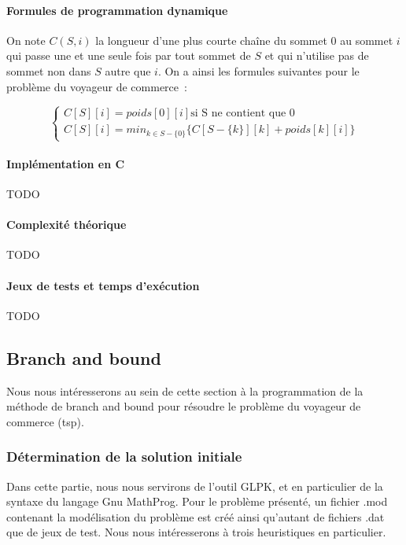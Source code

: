\documentclass[a4paper, 12pt]{article}
\begin{document}
\paragraph{Formules de programmation dynamique}

On note $C(S,i)$ la longueur d'une plus courte chaîne du sommet $0$ au
sommet $i$ qui passe une et une seule fois par tout sommet de $S$ et
qui n'utilise pas de sommet non dans $S$ autre que $i$. On a ainsi les
formules suivantes pour le problème du voyageur de commerce~:

\begin{equation}
\begin{cases}
C[S][i] = poids[0][i] \text{si S ne contient que $0$} \\
C[S][i] = min_{k \in S - \{ 0 \}} \{ C[S- \{ k \}][k] + poids[k][i]  \}
\end{cases}
\end{equation}

\paragraph{Implémentation en C}

TODO

\paragraph{Complexité théorique}

TODO

\paragraph{Jeux de tests et temps d'exécution}

TODO


\pagebreak

\subsection{Branch and bound}

Nous nous intéresserons au sein de cette section à la programmation de
la méthode de branch and bound pour résoudre le problème du voyageur
de commerce (tsp).

\subsubsection{Détermination de la solution initiale}

Dans cette partie, nous nous servirons de l'outil GLPK, et en
particulier de la syntaxe du langage Gnu MathProg. Pour le problème
présenté, un fichier .mod contenant la modélisation du problème est
créé ainsi qu'autant de fichiers .dat que de jeux de test. Nous nous
intéresserons à trois heuristiques en particulier.
\end{document}
